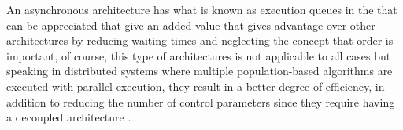 \documentclass[runningheads]{llncs}
\begin{document}


An asynchronous architecture has what is known as execution queues in the that
can be appreciated that give an added value that gives advantage over other
architectures by reducing waiting times and neglecting the concept that order is
important, of course, this type of architectures is not applicable to all cases
but speaking in distributed systems where multiple population-based algorithms
are executed with parallel execution, they result in a better degree of
efficiency, in addition to reducing the number of control parameters since they
require having a decoupled architecture \cite{Ma2019,Santander-jim2018}.
\end{document}
